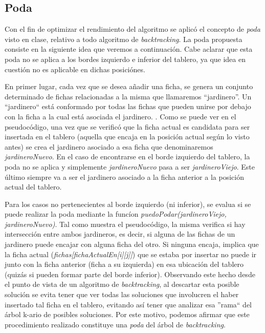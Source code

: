 \documentclass[a4paper,11pt] {article}
\begin{document}
\subsection*{Poda}

Con el fin de optimizar el rendimiento del algoritmo se aplicó el concepto de \textit{poda} visto en clase, relativo a todo algoritmo de \textit{backtracking}. La poda propuesta consiste en la siguiente idea que veremos a continuaci\'on. Cabe aclarar que esta poda no se aplica a los bordes izquierdo e inferior del tablero, ya que idea en cuesti\'on no es aplicable en dichas posici\'ones.

En primer lugar, cada vez que se desea añadir una ficha, se genera un conjunto determinado de fichas relacionadas a la misma que llamaremos ``jardinero''. Un ``jardinero`` est\'a conformado por todas las fichas que pueden unirse por debajo con la ficha a la cual est\'a asociada el jardinero. . Como se puede ver en el pseudoc\'odigo, una vez que se verific\'o que la ficha actual es candidata para ser insertada en el tablero (aquella que encaja en la posici\'on actual seg\'un lo visto antes) se crea el jardinero asociado a esa ficha que denominaremos \textit{jardineroNuevo}. En el caso de encontrarse en el borde izquierdo del tablero, la poda no se aplica y simplemente \textit{jardineroNuevo} pasa a ser \textit{jardineroViejo}. Este \'ultimo siempre va a ser el jardinero asociado a la ficha anterior a la posici\'on actual del tablero. 

Para los casos no pertenecientes al borde izquierdo (ni inferior), se evalua si se puede realizar la poda mediante la func\'ion \textit{puedoPodar(jardineroViejo, jardineroNuevo)}. Tal como muestra el pseudoc\'odigo, la misma verifica si hay intersecci\'on entre ambos jardineros, es decir, si alguna de las fichas de un jardinero puede encajar con alguna ficha del otro. Si ninguna encaja, implica que la ficha actual (\textit{fichas[fichaActualEn[i][j]]}) que se estaba por insertar no puede ir junto con la ficha anterior (ficha a su izquierda) en esa ubicaci\'on del tablero (quiz\'as si pueden formar parte del borde inferior). Observando este hecho desde el punto de vista de un algoritmo de \textit{backtracking}, al descartar esta posible soluci\'on se evita tener que ver todas las soluciones que involucren el haber insertado tal ficha en el tablero, evitando as\'i tener que analizar esa ''rama`` del \'arbol k-ario de posibles soluciones. Por este motivo, podemos afirmar que este procedimiento realizado constituye una \textit{poda} del \'arbol de \textit{backtracking}.
\end{document}
